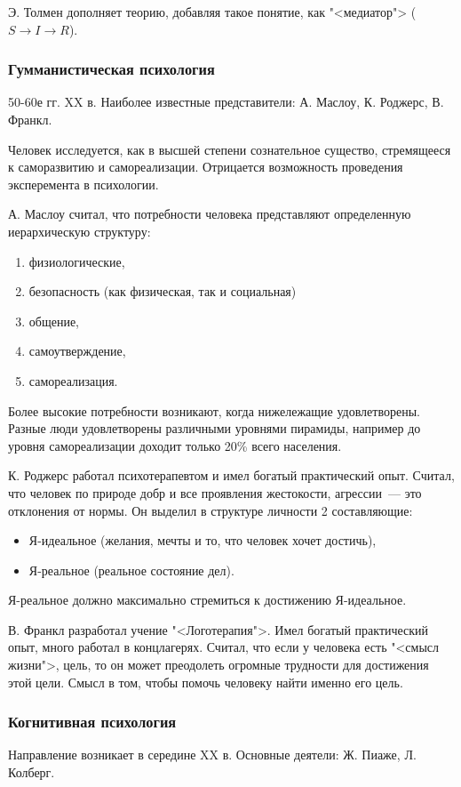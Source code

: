 Э. Толмен дополняет теорию, добавляя такое понятие, как "<медиатор"> ($S\rightarrow{}I\rightarrow{}R$).

\subsubsection{Гумманистическая психология}
50-60е гг. XX в. Наиболее известные представители: А. Маслоу, К. Роджерс, В. Франкл. 

Человек исследуется, как в высшей степени сознательное существо, стремящееся к саморазвитию и самореализации. Отрицается возможность проведения эксперемента в психологии.

А. Маслоу считал, что потребности человека представляют определенную иерархическую структуру:
\begin{enumerate}
	\item физиологические,
	\item безопасность (как физическая, так и социальная)
	\item общение,
	\item самоутверждение,
	\item самореализация.
\end{enumerate}
Более высокие потребности возникают, когда нижележащие удовлетворены. Разные люди удовлетворены различными уровнями пирамиды, например до уровня самореализации доходит только 20\% всего населения.

К. Роджерс работал психотерапевтом и имел богатый практический опыт. Считал, что человек по природе добр и все проявления жестокости, агрессии~--- это отклонения от нормы. Он выделил в структуре личности 2 составляющие:
\begin{itemize}
	\item Я-идеальное (желания, мечты и то, что человек хочет достичь),
	\item Я-реальное (реальное состояние дел).
\end{itemize}
Я-реальное должно максимально стремиться к достижению Я-идеальное.

В. Франкл разработал учение "<Логотерапия">. Имел богатый практический опыт, много работал в концлагерях. Считал, что если у человека есть "<смысл жизни">, цель, то он может преодолеть огромные трудности для достижения этой цели. Смысл в том, чтобы помочь человеку найти именно его цель.

\subsubsection{Когнитивная психология}
Направление возникает в середине XX в. Основные деятели: Ж. Пиаже, Л. Колберг.


